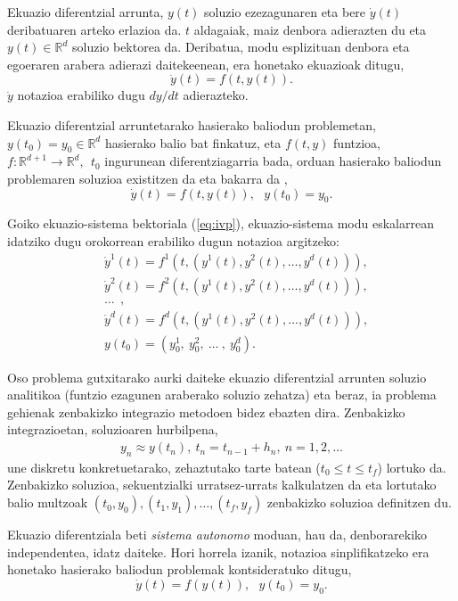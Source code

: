 Ekuazio diferentzial arrunta, $y(t)$ soluzio ezezagunaren eta bere $\dot{y}(t)$ deribatuaren arteko erlazioa da. $t$ aldagaiak, maiz denbora adierazten du eta $y(t) \in \mathbb{R}^{d}$ soluzio bektorea da. Deribatua, modu esplizituan denbora eta egoeraren arabera  adierazi daitekeenean, era honetako ekuazioak ditugu,
\begin{equation}
 \label{eq:201}
\dot{y}(t)=f(t,y(t)). 
\end{equation} 
$\dot{y}$ notazioa erabiliko dugu $dy/dt$ adierazteko.

Ekuazio diferentzial arruntetarako hasierako baliodun problemetan,  $y(t_0)=y_0 \in \mathbb{R}^d$ hasierako balio bat finkatuz, eta $f(t,y)$ funtzioa, $f: \mathbb{R}^{d+1} \longrightarrow \mathbb{R}^d, \ \ t_0$ ingurunean diferentziagarria bada, orduan hasierako baliodun problemaren soluzioa existitzen da eta bakarra da \cite{Hairer2006},
\begin{equation}
 \label{eq:ivp}
\dot{y}(t)=f(t,y(t)), \ \ \ y(t_0)=y_0.
\end{equation} 

Goiko ekuazio-sistema bektoriala (\ref{eq:ivp}), ekuazio-sistema modu eskalarrean idatziko dugu orokorrean erabiliko dugun notazioa argitzeko:
\begin{align*}
&\dot{y}^1(t)=f^1(t,(y^1(t),y^2(t),\ldots,y^d(t))), \\
&\dot{y}^2(t)=f^2(t,(y^1(t),y^2(t),\ldots,y^d(t))), \\
&\ldots\ \ ,\\
&\dot{y}^d(t)=f^d(t,(y^1(t),y^2(t),\ldots,y^d(t))),  \\
& y(t_0)=(y_{0}^1,\ y_{0}^2,\ \ldots \ , \ y_{0}^d).
\end{align*}


Oso problema gutxitarako aurki daiteke ekuazio diferentzial arrunten soluzio analitikoa (funtzio ezagunen araberako soluzio zehatza) eta beraz, ia problema gehienak zenbakizko integrazio metodoen bidez ebazten dira.
Zenbakizko integrazioetan, soluzioaren hurbilpena,
\begin{align*}
 y_n \approx y(t_n), \ t_n=t_{n-1}+h_n, \ n=1,2,\dots
\end{align*}
une diskretu konkretuetarako, zehaztutako tarte batean ($t_0\le t \le t_f$) lortuko da. Zenbakizko soluzioa, sekuentzialki urratsez-urrats kalkulatzen da eta lortutako balio  multzoak $(t_0,y_0),(t_1,y_1),\dots,(t_f,y_f)$ zenbakizko soluzioa definitzen du.   

Ekuazio diferentziala beti \emph{sistema autonomo} moduan, hau da, denborarekiko independentea, idatz daiteke. Hori horrela izanik, notazioa sinplifikatzeko era honetako hasierako baliodun problemak kontsideratuko ditugu,   
\begin{equation}
\label{eq:autonomo}
\dot{y}(t)=f(y(t)),\ \ \ y(t_0)=y_0.
\end{equation}

